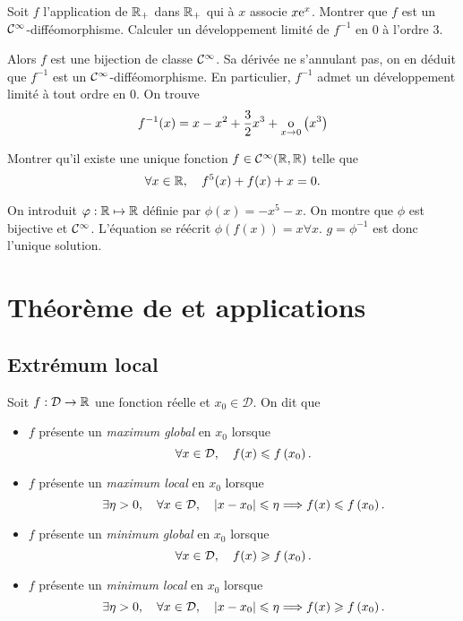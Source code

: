 \documentclass{magnolia}
\begin{document}
\begin{exos}
\exo Soit $f$ l'application de $\mathbb{R}_+$ dans $\mathbb{R}_+$ qui à $x$ associe $x{\rm e}^x$. Montrer que $f$ est un
  $\mathcal{C}^{\infty}$-difféomorphisme. Calculer un développement limité de $f^{-1}$ en 0 à l'ordre 3.
  \begin{sol}
  Alors $f$ est une bijection de classe $\mathcal{C}^{\infty}$.
  Sa dérivée ne s'annulant pas, on en déduit que $f^{-1}$ est un
  $\mathcal{C}^{\infty}$-difféomorphisme. En particulier,  $f^{-1}$ admet un
  développement limité à tout ordre en 0. On trouve
  \[f^{-1}(x)=x-x^2+\frac{3}{2}x^3+\underset{x \rightarrow 0}{\text{o}}\left(x^3\right)\]    
  \end{sol}
\exo Montrer qu'il existe une unique fonction $f\in\mathcal{C}^{\infty}(\mathbb{R},\mathbb{R})$
  telle que
  \[\forall x\in\mathbb{R} ,\quad f^5(x)+f(x)+x=0.\]
  \begin{sol}
    On introduit $\varphi:\mathbb{R}\mapsto\mathbb{R}$ définie par $\phi(x)=-x^5-x$. On montre que $\phi$ est bijective et $\mathcal{C}^{\infty}$. L'équation se réécrit $\phi(f(x))=x \forall x$. $g=\phi^{-1}$ est donc l'unique solution.
    \end{sol}
\end{exos}



\section{Théorème de  et applications}
\subsection{Extrémum local}
\begin{definition}[utile=-3]
Soit $f:\mathcal{D}\to\mathbb{R}$ une fonction réelle et $x_0\in\mathcal{D}$. On dit que
\begin{itemize}
\item $f$ présente un \emph{maximum global} en $x_0$ lorsque
  \[\forall x\in\mathcal{D} ,\quad f(x)\leqslant f\left(x_0\right).\]
\item $f$ présente un \emph{maximum local} en $x_0$ lorsque
  \[\exists \eta>0 ,\quad \forall x\in\mathcal{D} ,\quad
    \left|x-x_0\right|\leqslant\eta \Longrightarrow f(x)\leqslant f\left(x_0\right).\]
\item $f$ présente un \emph{minimum global} en $x_0$ lorsque
  \[\forall x\in\mathcal{D} ,\quad f(x)\geqslant f\left(x_0\right).\]
\item $f$ présente un \emph{minimum local} en $x_0$ lorsque
  \[\exists \eta>0 ,\quad \forall x\in\mathcal{D} ,\quad
    \left|x-x_0\right|\leqslant\eta \Longrightarrow f(x)\geqslant f\left(x_0\right).\]
\end{itemize}
\end{definition}
\end{document}
